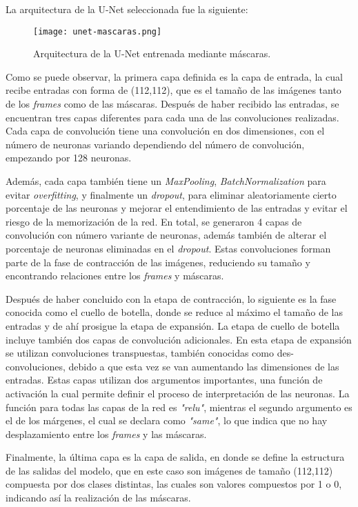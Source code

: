 \documentclass[runningheads]{llncs}
\begin{document}
La arquitectura de la U-Net seleccionada fue la siguiente:

\begin{figure}[H]
    \centering
    \texttt{[image: unet-mascaras.png]}
    \caption{Arquitectura de la U-Net entrenada mediante máscaras.}
\end{figure}

Como se puede observar, la primera capa definida es la capa de entrada, la cual recibe entradas con forma de (112,112), que es el tamaño de las imágenes tanto de los \textit{frames} como de las máscaras. Después de haber recibido las entradas, se encuentran tres capas diferentes para cada una de las convoluciones realizadas. Cada capa de convolución tiene una convolución en dos dimensiones, con el número de neuronas variando dependiendo del número de convolución, empezando por 128 neuronas.

Además, cada capa también tiene un \textit{MaxPooling}, \textit{BatchNormalization} para evitar \textit{overfitting}, y finalmente un \textit{dropout}, para eliminar aleatoriamente cierto porcentaje de las neuronas y mejorar el entendimiento de las entradas y evitar el riesgo de la memorización de la red. En total, se generaron 4 capas de convolución con número variante de neuronas, además también de alterar el porcentaje de neuronas eliminadas en el \textit{dropout}. Estas convoluciones forman parte de la fase de contracción de las imágenes, reduciendo su tamaño y encontrando relaciones entre los \textit{frames} y máscaras.

Después de haber concluido con la etapa de contracción, lo siguiente es la fase conocida como el cuello de botella, donde se reduce al máximo el tamaño de las entradas y de ahí prosigue la etapa de expansión. La etapa de cuello de botella incluye también dos capas de convolución adicionales. En esta etapa de expansión se utilizan convoluciones transpuestas, también conocidas como des-convoluciones, debido a que esta vez se van aumentando las dimensiones de las entradas. Estas capas utilizan dos argumentos importantes, una función de activación la cual permite definir el proceso de interpretación de las neuronas. La función para todas las capas de la red es \textit{"relu"}, mientras el segundo argumento es el de los márgenes, el cual se declara como \textit{"same"}, lo que indica que no hay desplazamiento entre los \textit{frames} y las máscaras. 

Finalmente, la última capa es la capa de salida, en donde se define la estructura de las salidas del modelo, que en este caso son imágenes de tamaño (112,112) compuesta por dos clases distintas, las cuales son valores compuestos por 1 o 0, indicando así la realización de las máscaras.
\end{document}
